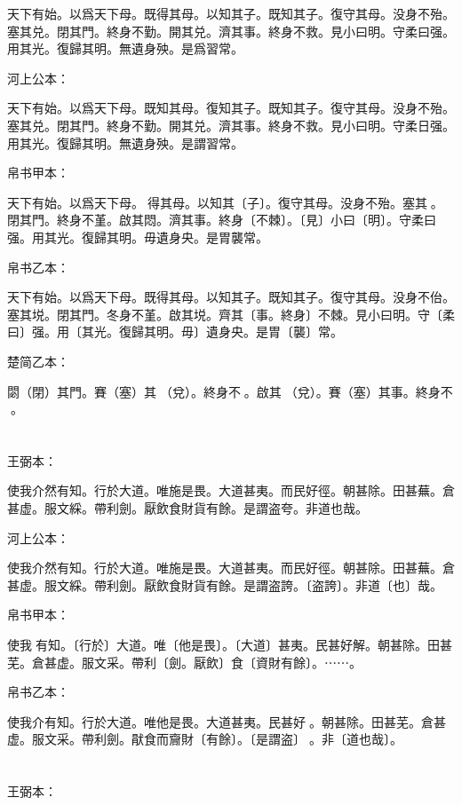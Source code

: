 \documentclass[a5paper]{ctexbook}
\begin{document}
    天下有始。以爲天下母。既得其母。以知其子。既知其子。復守其母。没身不殆。塞其兑。閉其門。終身不勤。開其兑。濟其事。終身不救。見小曰明。守柔曰强。用其光。復歸其明。無遺身殃。是爲習常。

    河上公本：

    天下有始。以爲天下母。既知其母。復知其子。既知其子。復守其母。没身不殆。塞其兑。閉其門。終身不勤。開其兑。濟其事。終身不救。見小曰明。守柔日强。用其光。復歸其明。無遺身殃。是謂習常。

    帛书甲本：

    天下有始。以爲天下母。𢟪得其母。以知其〔子〕。復守其母。没身不殆。塞其󱁂。閉其門。終身不堇。啟其悶。濟其事。終身〔不棘〕。〔見〕小曰〔明〕。守柔曰强。用其光。復歸其明。毋遺身央。是胃襲常。

    帛书乙本：

    天下有始。以爲天下母。既得其母。以知其子。既知其子。復守其母。没身不佁。塞其㙂。閉其門。冬身不堇。啟其㙂。齊其〔事。終身〕不棘。見小曰明。守〔柔曰〕强。用〔其光。復歸其明。毋〕遺身央。是胃〔襲〕常。

    楚简乙本：

    閟（閉）其門。賽（塞）其𨓚（兌）。終身不󼲆。啟其𨓚（兌）。賽（塞）其事。終身不󶵠。

    \chapter{}
    王弼本：

    使我介然有知。行於大道。唯施是畏。大道甚夷。而民好徑。朝甚除。田甚蕪。倉甚虚。服文綵。帶利劍。厭飲食財貨有餘。是謂盗夸。非道也哉。

    河上公本：

    使我介然有知。行於大道。唯施是畏。大道甚夷。而民好徑。朝甚除。田甚蕪。倉甚虚。服文綵。帶利劍。厭飲食財貨有餘。是謂盗誇。〔盗誇〕。非道〔也〕哉。

    帛书甲本：

    使我𢴲有知。〔行於〕大道。唯〔他是畏〕。〔大道〕甚夷。民甚好解。朝甚除。田甚芜。倉甚虚。服文采。帶利〔劍。厭飲〕食〔資財有餘〕。⋯⋯。

    帛书乙本：

    使我介有知。行於大道。唯他是畏。大道甚夷。民甚好𠎿。朝甚除。田甚芜。倉甚虚。服文采。帶利劍。猒食而齎財〔有餘〕。〔是謂盗〕󱀖。非〔道也哉〕。

    \chapter{}
    王弼本：
\end{document}
